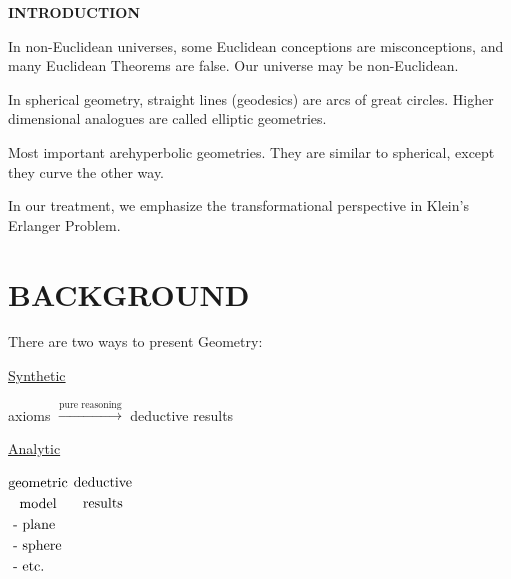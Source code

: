 \documentclass{book}
\begin{document}
\newpage

\begin{center}
{{\bf{}\Huge INTRODUCTION}}
\end{center}

\vspace{30pt}

In non-Euclidean universes, some Euclidean conceptions are misconceptions, and many Euclidean Theorems are false. Our universe may be non-Euclidean.

\vspace{10pt}

In spherical geometry, straight lines (geodesics) are arcs of great circles. Higher dimensional analogues are called elliptic geometries.

\vspace{10pt}

Most important arehyperbolic geometries. They are similar to spherical, except they curve the other way.

\vspace{10pt}

In our treatment, we emphasize the transformational perspective in Klein's Erlanger Problem.





\part{BACKGROUND}

There are two ways to present Geometry:

\vspace{10pt}

\underline{Synthetic}

\begin{center}
axioms $\xrightarrow{\mbox{pure reasoning}}$ deductive results
\end{center}

\vspace{10pt}

\underline{Analytic}

\begin{center}
$\begin{aligned}[t]\multicolumn{1}{c}{\mbox{geometric}}\\\multicolumn{1}{c}{\mbox{model}}\\\multicolumn{1}{l}{\mbox{ - plane}}\\\multicolumn{1}{l}{\mbox{ - sphere}}\\\multicolumn{1}{l}{\mbox{ - etc.}}\end{aligned}$  $\begin{aligned}[t]\multicolumn{1}{c}{\mbox{deductive}}\\\multicolumn{1}{c}{\mbox{results}}\end{aligned}$
\end{center}
\end{document}
